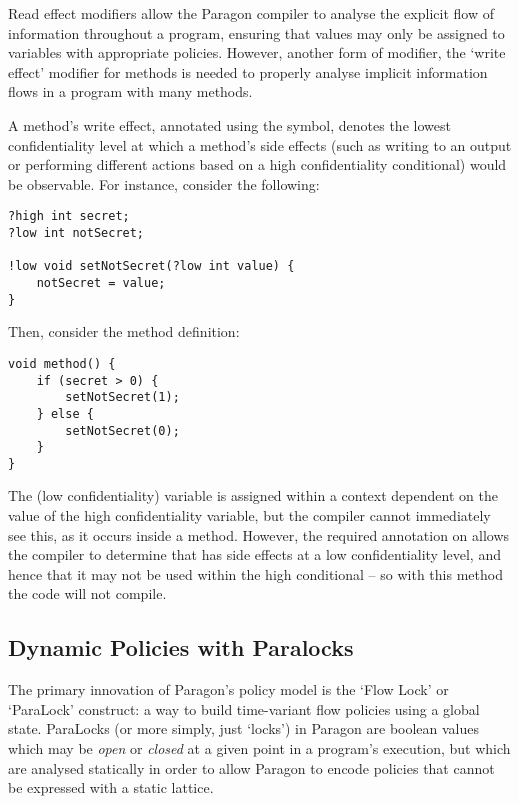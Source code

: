 Read effect modifiers allow the Paragon compiler to analyse the explicit flow of information throughout a program, ensuring that values may only be assigned to variables with appropriate policies. However, another form of modifier, the `write effect' modifier for methods is needed to properly analyse implicit information flows in a program with many methods.

A method's write effect, annotated using the \mono{!} symbol, denotes the lowest confidentiality level at which a method's side effects (such as writing to an output or performing different actions based on a high confidentiality conditional) would be observable. For instance, consider the following:

\begin{verbatim}
?high int secret;
?low int notSecret;

!low void setNotSecret(?low int value) {
	notSecret = value;
}
\end{verbatim}

Then, consider the method definition:

\begin{verbatim}
void method() {
	if (secret > 0) {
		setNotSecret(1);
	} else {
		setNotSecret(0);
	}
}
\end{verbatim}

The (low confidentiality)  variable is assigned within a context dependent on the value of the high confidentiality  variable, but the compiler cannot immediately see this, as it occurs inside a method. However, the required  annotation on  allows the compiler to determine that  has side effects at a low confidentiality level, and hence that it may not be used within the high conditional -- so with this method the code will not compile.

\subsection{Dynamic Policies with Paralocks}

The primary innovation of Paragon's policy model is the `Flow Lock' or `ParaLock' construct: a way to build time-variant flow policies using a global state. ParaLocks (or more simply, just `locks') in Paragon are boolean values which may be \textit{open} or \textit{closed} at a given point in a program's execution, but which are analysed statically in order to allow Paragon to encode policies that cannot be expressed with a static lattice.


